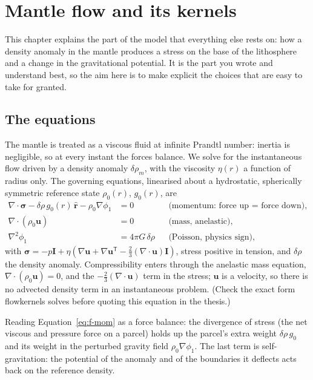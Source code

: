 \chapter{Mantle flow and its kernels}
\label{ch:flow}

This chapter explains the part of the model that everything else rests on: how a density anomaly in the mantle produces a stress on the base of the lithosphere and a change in the gravitational potential.
It is the part you wrote and understand best, so the aim here is to make explicit the choices that are easy to take for granted.

\section{The equations}

The mantle is treated as a viscous fluid at infinite Prandtl number: inertia is negligible, so at every instant the forces balance.
We solve for the instantaneous flow driven by a density anomaly $\delta\rho_m$, with the viscosity $\eta(r)$ a function of radius only.
The governing equations, linearised about a hydrostatic, spherically symmetric reference state $\rho_0(r)$, $g_0(r)$, are
\begin{align}
    \nabla\cdot\bm{\sigma} - \delta\rho\, g_0(r)\,\hat{\bm r} - \rho_0\nabla\phi_1 &= 0
    && \text{(momentum: force up = force down)}, \label{eq:f-mom}\\
    \nabla\cdot(\rho_0\bm u) &= 0
    && \text{(mass, anelastic)}, \label{eq:f-mass}\\
    \nabla^2\phi_1 &= 4\pi G\,\delta\rho
    && \text{(Poisson, physics sign)}, \label{eq:f-poisson}
\end{align}
with $\bm\sigma = -p\bm I + \eta(\nabla\bm u + \nabla\bm u^{\mathsf T} - \tfrac23(\nabla\cdot\bm u)\bm I)$, stress positive in tension, and $\delta\rho$ the density anomaly.
Compressibility enters through the anelastic mass equation, $\nabla\cdot(\rho_0\bm u)=0$, and the $-\tfrac23(\nabla\cdot\bm u)$ term in the stress; $\bm u$ is a velocity, so there is no advected density term in an instantaneous problem. (Check the exact form flowkernels solves before quoting this equation in the thesis.)

Reading Equation~\eqref{eq:f-mom} as a force balance: the divergence of stress (the net viscous and pressure force on a parcel) holds up the parcel's extra weight $\delta\rho\,g_0$ and its weight in the perturbed gravity field $\rho_0\nabla\phi_1$.
The last term is self-gravitation: the potential of the anomaly and of the boundaries it deflects acts back on the reference density.

